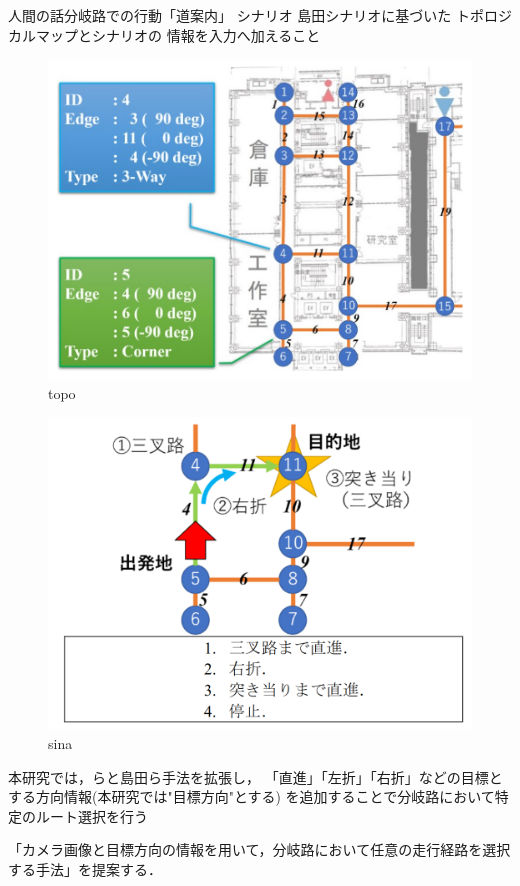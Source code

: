人間の話分岐路での行動「道案内」
シナリオ
島田シナリオに基づいた
トポロジカルマップとシナリオの
情報を入力へ加えること
\begin{figure}[H]
    \centering
    \includegraphics[width = 12cm]{./figs/topo.png}
    \caption{topo\cite{razikon}}
    \label{fig::topo}
\end{figure}
\begin{figure}[H]
    \centering
    \includegraphics[width = 12cm]{./figs/sina.png}
    \caption{sina\cite{razikon}}
    \label{fig::sina}
\end{figure}
本研究では，\cite{okada}らと島田ら手法を拡張し，
「直進」「左折」「右折」などの目標とする方向情報(本研究では"目標方向"とする)
を追加することで分岐路において特定のルート選択を行う

「カメラ画像と目標方向の情報を用いて，分岐路において任意の走行経路を選択する手法」を提案する．


